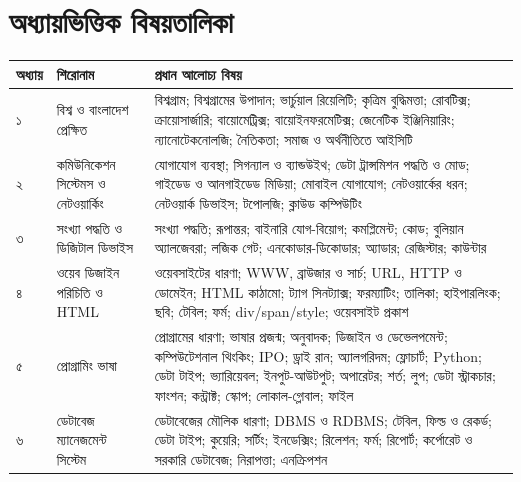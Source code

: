 \chapter*{অধ্যায়ভিত্তিক বিষয়তালিকা}

\begin{compacttable}
\begin{tabular}{|p{}|p{}|p{}|}
\hline
\textbf{অধ্যায়} & \textbf{শিরোনাম} & \textbf{প্রধান আলোচ্য বিষয়} \\
\hline
১ & বিশ্ব ও বাংলাদেশ প্রেক্ষিত & বিশ্বগ্রাম; বিশ্বগ্রামের উপাদান; ভার্চুয়াল রিয়েলিটি; কৃত্রিম বুদ্ধিমত্তা; রোবটিক্স; ক্রায়োসার্জারি; বায়োমেট্রিক্স; বায়োইনফরমেটিক্স; জেনেটিক ইঞ্জিনিয়ারিং; ন্যানোটেকনোলজি; নৈতিকতা; সমাজ ও অর্থনীতিতে আইসিটি \\
\hline
২ & কমিউনিকেশন সিস্টেমস ও নেটওয়ার্কিং & যোগাযোগ ব্যবস্থা; সিগন্যাল ও ব্যান্ডউইথ; ডেটা ট্রান্সমিশন পদ্ধতি ও মোড; গাইডেড ও আনগাইডেড মিডিয়া; মোবাইল যোগাযোগ; নেটওয়ার্কের ধরন; নেটওয়ার্ক ডিভাইস; টপোলজি; ক্লাউড কম্পিউটিং \\
\hline
৩ & সংখ্যা পদ্ধতি ও ডিজিটাল ডিভাইস & সংখ্যা পদ্ধতি; রূপান্তর; বাইনারি যোগ-বিয়োগ; কমপ্লিমেন্ট; কোড; বুলিয়ান অ্যালজেবরা; লজিক গেট; এনকোডার-ডিকোডার; অ্যাডার; রেজিস্টার; কাউন্টার \\
\hline
৪ & ওয়েব ডিজাইন পরিচিতি ও HTML & ওয়েবসাইটের ধারণা; WWW, ব্রাউজার ও সার্চ; URL, HTTP ও ডোমেইন; HTML কাঠামো; ট্যাগ সিনট্যাক্স; ফরম্যাটিং; তালিকা; হাইপারলিংক; ছবি; টেবিল; ফর্ম; div/span/style; ওয়েবসাইট প্রকাশ \\
\hline
৫ & প্রোগ্রামিং ভাষা & প্রোগ্রামের ধারণা; ভাষার প্রজন্ম; অনুবাদক; ডিজাইন ও ডেভেলপমেন্ট; কম্পিউটেশনাল থিংকিং; IPO; ড্রাই রান; অ্যালগরিদম; ফ্লোচার্ট; Python; ডেটা টাইপ; ভ্যারিয়েবল; ইনপুট-আউটপুট; অপারেটর; শর্ত; লুপ; ডেটা স্ট্রাকচার; ফাংশন; কন্ট্রাক্ট; স্কোপ; লোকাল-গ্লোবাল; ফাইল \\
\hline
৬ & ডেটাবেজ ম্যানেজমেন্ট সিস্টেম & ডেটাবেজের মৌলিক ধারণা; DBMS ও RDBMS; টেবিল, ফিল্ড ও রেকর্ড; ডেটা টাইপ; কুয়েরি; সর্টিং; ইনডেক্সিং; রিলেশন; ফর্ম; রিপোর্ট; কর্পোরেট ও সরকারি ডেটাবেজ; নিরাপত্তা; এনক্রিপশন \\
\hline
\end{tabular}
\end{compacttable}
